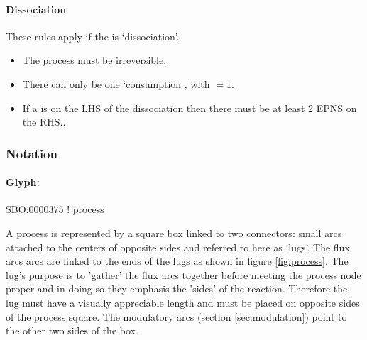 \paragraph{Dissociation}

These rules apply if the  is `dissociation'.

\begin{itemize}
\item The process must be irreversible.
\item There can only be one `consumption , with
   $= 1$.
\item If a  is on the LHS of the dissociation then
  there must be at least 2 EPNS on the RHS..
\end{itemize}

\subsubsection{Notation}

\paragraph{Glyph: }
\label{sec:process}

\begin{glyphDescription}

\glyphSboTerm SBO:0000375 ! process

\glyphNode A process is represented by a square box linked to two
connectors: small arcs attached to the centers of opposite sides and
referred to here as `lugs'. The
flux arcs arcs are linked to the ends of the lugs as shown in figure
\ref{fig:process}. The lug's purpose is to 'gather' the flux arcs
together before meeting the process node proper and in doing so they
emphasis the 'sides' of the reaction. Therefore the lug must have a
visually appreciable length and must be placed on opposite sides
of the process square. The modulatory arcs (section
\ref{sec:modulation}) point to the other two sides of the box.

\end{glyphDescription}


